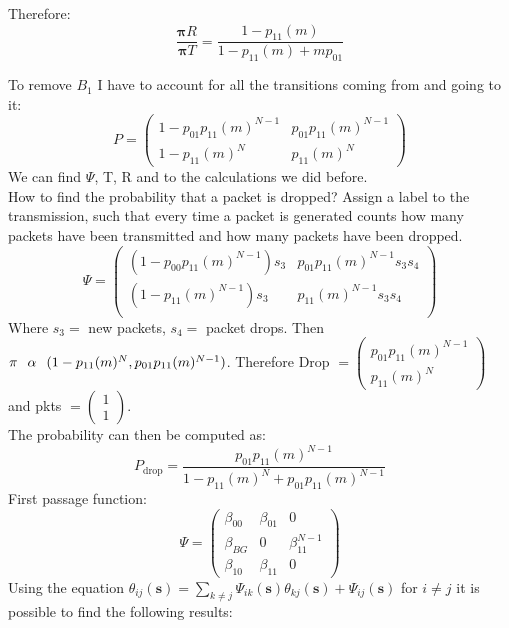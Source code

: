 Therefore:
\begin{equation}
		\frac{\mathbf{\pi}R}{\mathbf{\pi}T} = \frac{1-p_{11}(m)}{1-p_{11}(m)+ mp_{01}}
\end{equation}

To remove $B_1$ I have to account for all the transitions coming from and going to it: \\
$$P =
\begin{pmatrix}
		1-p_{01}p_{11}(m)^{N-1} & p_{01}p_{11}(m)^{N-1} \\
		1-p_{11}(m)^N & p_{11}(m)^N
\end{pmatrix}$$
We can find $\Psi$, T, R and to the calculations we did before. \\
How to find the probability that a packet is dropped?
Assign a label to the transmission, such that every time a packet is generated counts how many packets have been transmitted and how many packets have been dropped.
$$\Psi=
\begin{pmatrix}
	 (1- p_{00}p_{11}(m)^{N-1})s_3 & p_{01}p_{11}(m)^{N-1}s_3s_4 \\
	 (1- p_{11}(m)^{N-1})s_3 & p_{11}(m)^{N-1}s_3s_4 \\
\end{pmatrix} $$
Where $s_3 =$ new packets, $s_4 =$ packet drops. Then $\mathbf{\pi} \hspace{0.25cm} \alpha \hspace{0.25cm} (1-p_{11}(m)^N,p_{01}p_{11}(m)^{N-1})$.
Therefore Drop $= \begin{pmatrix} p_{01}p_{11}(m)^{N-1} \\ p_{11}(m)^N \end{pmatrix}$ and pkts $= \begin{pmatrix} 1 \\ 1 \end{pmatrix}$.\\
The probability can then be computed as:
\begin{equation}
	P_{\text{drop}} = \frac{p_{01}p_{11}(m)^{N-1}}{1-p_{11}(m)^N + p_{01}p_{11}(m)^{N-1}}
\end{equation}
First passage function:
$$\Psi=
\begin{pmatrix}
	 \beta_{00} & \beta_{01} & 0 \\
	 \beta_{BG} & 0 & \beta_{11}^{N-1} \\
	 \beta_{10} & \beta_{11} & 0
\end{pmatrix} $$
Using the equation $\theta_{ij}(\textbf{s}) = \sum_{k \neq j} \Psi_{ik}(\textbf{s})\theta_{kj}(\textbf{s}) + \Psi_{ij}(\textbf{s})$ for $i\neq j$ it is possible to find the following results:
